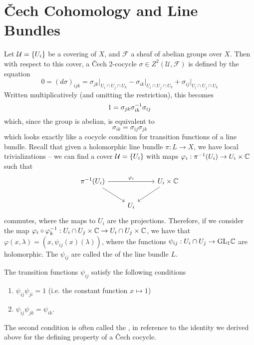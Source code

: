 \section{\v{C}ech Cohomology and Line Bundles}
%
Let $\mathcal{U} = \left\lbrace U_i \right\rbrace$ be a covering of $X$, and $\mathcal{F}$ a sheaf
of abelian groups over $X$. Then with respect to this cover, a \v{C}ech 2-cocycle
$\sigma \in Z^2(\mathcal{U}, \mathcal{F})$ is defined by the equation
\[
0 = (d\sigma)_{ijk} = \sigma_{jk}\vert_{U_i \cap U_j \cap U_k}
- \sigma_{ik}\vert_{U_i \cap U_j \cap U_k} + \sigma_{ij}\vert_{U_i \cap U_j \cap U_k}
\]
Written multiplicatively (and omitting the restriction), this becomes
\[
1 = \sigma_{jk}\sigma_{ik}^{-1}\sigma_{ij}
\]
which, since the group is abelian, is equivalent to
\[
\sigma_{ik} = \sigma_{ij}\sigma_{jk}
\]
which looks exactly like a cocycle condition for transition functions of a line
bundle. Recall that given a holomorphic line bundle $\pi : L \to X$, we have local
trivializations -- we can find a cover $\mathcal{U} = \left\lbrace U_i \right\rbrace$ with maps
$\varphi_i : \pi^{-1}(U_i) \to U_i \times \mathbb{C}$ such that
\[\begin{tikzcd}
\pi\inv(U_i) \ar[rr, "\varphi_i"] \ar[dr] & & U_i \times \C \ar[dl] \\
& U_i
\end{tikzcd}\]
commutes, where the maps to $U_i$ are the projections. Therefore, if we consider
the map
$\varphi_i \circ \varphi_k^{-1} : U_i \cap U_j \times \mathbb{C} \to U_i \cap U_j \times \mathbb{C}$,
we have that $\varphi(x, \lambda) = (x, \psi_{ij}(x)(\lambda))$, where the functions
$\psi_{ij} : U_i\cap U_j \to \mathrm{GL}_1\mathbb{C}$ are holomorphic. The $\psi_{ij}$
are called the  of the line bundle $L$.
%
\begin{prop}
The transition functions $\psi_{ij}$ satisfy the following conditions
\begin{enumerate}
  \item $\psi_{ij}\psi_{ji} = 1$ (i.e. the constant function $x \mapsto 1$)
  \item $\psi_{ij}\psi_{jk} = \psi_{ik}$.
\end{enumerate}
The second condition is often called the , in reference to the
identity we derived above for the defining property of a \v{C}ech cocycle.
\end{prop}
%
